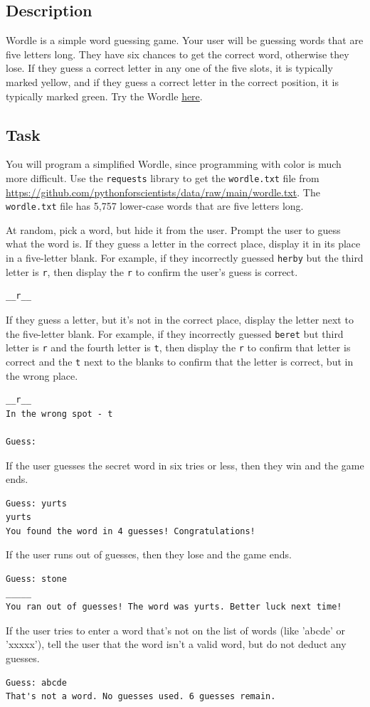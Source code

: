 \subsection*{Description}
Wordle is a simple word guessing game. Your user will be guessing words that are five letters long. They have six chances to get the correct word, otherwise they lose. If they guess a correct letter in any one of the five slots, it is typically marked yellow, and if they guess a correct letter in the correct position, it is typically marked green. Try the Wordle \href{https://www.nytimes.com/games/wordle/index.html}{here}.
\subsection*{Task}
You will program a simplified Wordle, since programming with color is much more difficult. Use the \verb|requests| library to get the \verb|wordle.txt| file from \\\href{https://github.com/pythonforscientists/data/raw/main/wordle.txt}{https://github.com/pythonforscientists/data/raw/main/wordle.txt}. The \verb|wordle.txt| file has 5,757 lower-case words that are five letters long.\par
At random, pick a word, but hide it from the user. Prompt the user to guess what the word is. If they guess a letter in the correct place, display it in its place in a five-letter blank. For example, if they incorrectly guessed \verb|herby| but the third letter is \verb|r|, then display the \verb|r| to confirm the user's guess is correct.
\begin{lstlisting}[style=none]
__r__
\end{lstlisting}
If they guess a letter, but it's not in the correct place, display the letter next to the five-letter blank. For example, if they incorrectly guessed \verb|beret| but third letter is \verb|r| and the fourth letter is \verb|t|, then display the \verb|r| to confirm that letter is correct and the \verb|t| next to the blanks to confirm that the letter is correct, but in the wrong place.
\begin{lstlisting}[style=none]
__r__
In the wrong spot - t

Guess: 
\end{lstlisting}
If the user guesses the secret word in six tries or less, then they win and the game ends.
\begin{lstlisting}[style=none]
Guess: yurts
yurts
You found the word in 4 guesses! Congratulations!
\end{lstlisting}
If the user runs out of guesses, then they lose and the game ends. 
\begin{lstlisting}[style=none]
Guess: stone
_____
You ran out of guesses! The word was yurts. Better luck next time!
\end{lstlisting}
If the user tries to enter a word that's not on the list of words (like 'abcde' or 'xxxxx'), tell the user that the word isn't a valid word, but do not deduct any guesses.
\begin{lstlisting}
Guess: abcde
That's not a word. No guesses used. 6 guesses remain.
\end{lstlisting}
